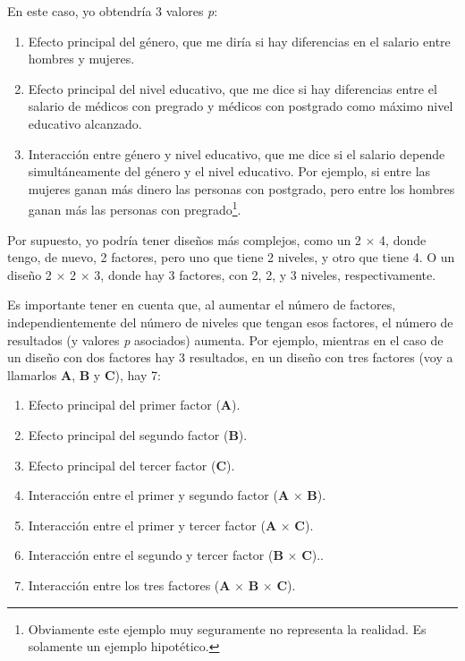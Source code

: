 \documentclass[
]{article}
\providecommand{\tightlist}{%
  \setlength{\itemsep}{0pt}\setlength{\parskip}{0pt}}
\begin{document}
En este caso, yo obtendría 3 valores \emph{p}:

\begin{enumerate}
\def\labelenumi{\arabic{enumi}.}
\tightlist
\item
  Efecto principal del género, que me diría si hay diferencias en el
  salario entre hombres y mujeres.
\item
  Efecto principal del nivel educativo, que me dice si hay diferencias
  entre el salario de médicos con pregrado y médicos con postgrado como
  máximo nivel educativo alcanzado.
\item
  Interacción entre género y nivel educativo, que me dice si el salario
  depende simultáneamente del género y el nivel educativo. Por ejemplo,
  si entre las mujeres ganan más dinero las personas con postgrado, pero
  entre los hombres ganan más las personas con pregrado\footnote{Obviamente
    este ejemplo muy seguramente no representa la realidad. Es solamente
    un ejemplo hipotético.}.
\end{enumerate}

Por supuesto, yo podría tener diseños más complejos, como un 2
\(\times\) 4, donde tengo, de nuevo, 2 factores, pero uno que tiene 2
niveles, y otro que tiene 4. O un diseño 2 \(\times\) 2 \(\times\) 3,
donde hay 3 factores, con 2, 2, y 3 niveles, respectivamente.

Es importante tener en cuenta que, al aumentar el número de factores,
independientemente del número de niveles que tengan esos factores, el
número de resultados (y valores \emph{p} asociados) aumenta. Por
ejemplo, mientras en el caso de un diseño con dos factores hay 3
resultados, en un diseño con tres factores (voy a llamarlos \textbf{A},
\textbf{B} y \textbf{C}), hay 7:

\begin{enumerate}
\def\labelenumi{\arabic{enumi}.}
\tightlist
\item
  Efecto principal del primer factor (\textbf{A}).
\item
  Efecto principal del segundo factor (\textbf{B}).
\item
  Efecto principal del tercer factor (\textbf{C}).
\item
  Interacción entre el primer y segundo factor (\textbf{A} \(\times\)
  \textbf{B}).
\item
  Interacción entre el primer y tercer factor (\textbf{A} \(\times\)
  \textbf{C}).
\item
  Interacción entre el segundo y tercer factor (\textbf{B} \(\times\)
  \textbf{C})..
\item
  Interacción entre los tres factores (\textbf{A} \(\times\) \textbf{B}
  \(\times\) \textbf{C}).
\end{enumerate}
\end{document}

